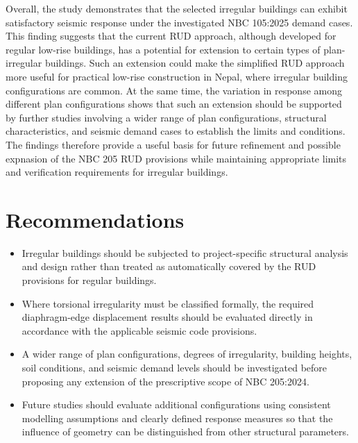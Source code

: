 Overall, the study demonstrates that the selected irregular buildings can exhibit satisfactory seismic response under the investigated NBC 105:2025 demand cases. This finding suggests that the current RUD approach, although developed for regular low-rise buildings, has a potential for extension to certain types of plan-irregular buildings. Such an extension could make the simplified RUD approach more useful for practical low-rise construction in Nepal, where irregular building configurations are common. At the same time, the variation in response among different plan configurations shows that such an extension should be supported by further studies involving a wider range of plan configurations, structural characteristics, and seismic demand cases to establish the limits and conditions. The findings therefore provide a useful basis for future refinement and possible expnasion of the NBC 205 RUD provisions while maintaining appropriate limits and verification requirements for irregular buildings.

\section{Recommendations}
\begin{itemize}[leftmargin=0.8cm,itemsep=0.45em,topsep=0.3em,label=\textbullet]
\item Irregular buildings should be subjected to project-specific structural analysis and design rather than treated as automatically covered by the RUD provisions for regular buildings.
\item Where torsional irregularity must be classified formally, the required diaphragm-edge displacement results should be evaluated directly in accordance with the applicable seismic code provisions.
\item A wider range of plan configurations, degrees of irregularity, building heights, soil conditions, and seismic demand levels should be investigated before proposing any extension of the prescriptive scope of NBC 205:2024.
\item Future studies should evaluate additional configurations using consistent modelling assumptions and clearly defined response measures so that the influence of geometry can be distinguished from other structural parameters.
\end{itemize}
